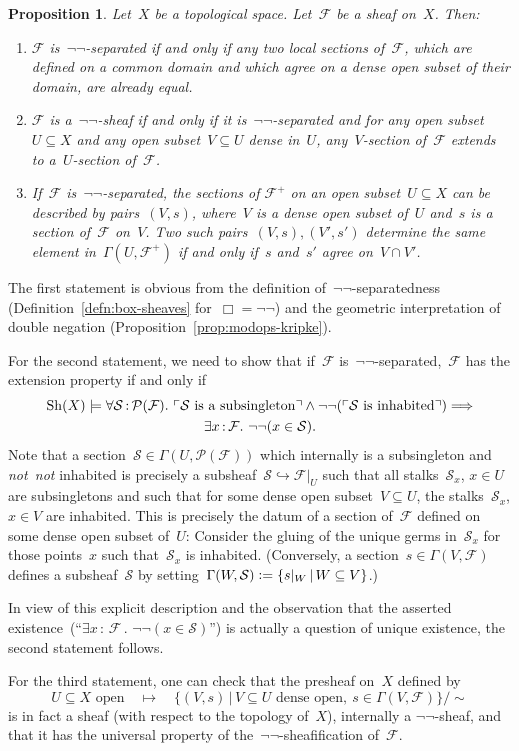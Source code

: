 \documentclass[10pt,reqno,a4paper]{amsbook}
\makeatletter
\theoremstyle{definition}
\theoremstyle{plain}
\newtheorem{prop}[defn]{Proposition}
\theoremstyle{remark}
\newcommand{\F}{\mathcal{F}}
\renewcommand{\P}{\mathcal{P}}
\renewcommand{\S}{\mathcal{S}}
\newcommand{\Sh}{\mathrm{Sh}}
\newcommand{\?}{\,{:}\,}
\renewcommand{\_}{\mathpunct{.}\,}
\newcommand{\speak}[1]{\ulcorner\text{\textnormal{#1}}\urcorner}
\newcommand{\notnot}{\emph{not~not}\xspace}
\newcommand{\defeq}{\vcentcolon=}
\renewenvironment{proof}[1][\proofname]{\par
  \pushQED{\qed}%
  \normalfont \topsep6\p@\@plus6\p@\relax
  \trivlist
  \item[\hskip\labelsep
        \itshape
    #1\@addpunct{.}]\ignorespaces
}{%
  \popQED\endtrivlist\@endpefalse
}
\makeatother
\begin{document}
\begin{prop}\label{prop:negneg-sheaves}
Let~$X$ be a topological space. Let~$\F$ be a sheaf on~$X$. Then:
\begin{enumerate}
\item $\F$ is~$\neg\neg$-separated if and only if any two local sections
of~$\F$, which are defined on a common domain and which agree on a dense open
subset of their domain, are already equal.
\item $\F$ is a~$\neg\neg$-sheaf if and only if it is~$\neg\neg$-separated and
for any open subset~$U \subseteq X$ and any open subset~$V \subseteq U$ dense
in~$U$, any~$V$-section of~$\F$ extends to a~$U$-section of~$\F$.
\item If~$\F$ is~$\neg\neg$-separated, the sections of $\F^+$ on an open
subset~$U \subseteq X$ can be described by pairs~$(V,s)$, where~$V$ is a dense
open subset of~$U$ and~$s$ is a section of~$\F$ on~$V$. Two such pairs~$(V,s),
(V',s')$ determine the same element in~$\Gamma(U,\F^+)$ if and only if~$s$ and~$s'$
agree on~$V \cap V'$.
\end{enumerate}
\end{prop}
\begin{proof}
The first statement is obvious from the definition of~$\neg\neg$-separatedness
(Definition~\ref{defn:box-sheaves} for~$\Box = \neg\neg$) and the geometric
interpretation of double negation (Proposition~\ref{prop:modops-kripke}).

For the second statement, we need to show that if~$\F$
is~$\neg\neg$-separated,~$\F$ has the extension property if and only if
\begin{multline*}
  \Sh(X) \models \forall \S \? \P(\F)\_
  \speak{$\S$ is a subsingleton} \wedge
  \neg\neg(\speak{$\S$ is inhabited}) \Longrightarrow \\
  \exists x\?\F\_ \neg\neg(x \in \S).
\end{multline*}
Note that a section~$\S \in \Gamma(U,\P(\F))$ which internally is a
subsingleton and \notnot inhabited is precisely a subsheaf~$\S \hookrightarrow
\F|_U$ such that all stalks~$\S_x$, $x \in U$ are subsingletons and such that for
some dense open subset~$V \subseteq U$, the stalks~$\S_x$, $x \in V$ are
inhabited. This is precisely the datum of a section of~$\F$ defined on some
dense open subset of~$U$: Consider the gluing of the unique germs in~$\S_x$ for
those points~$x$ such that~$\S_x$ is inhabited. (Conversely, a section~$s \in
\Gamma(V,\F)$ defines a subsheaf~$\S$ by setting~$\Gamma(W,\S) \defeq \{ s|_W \,|\,
W \subseteq V \}$.)

In view of this explicit description and the observation that the asserted
existence~(``$\exists x\?\F\_ \neg\neg(x \in \S)$'') is actually a question of
unique existence, the second statement follows.

For the third statement, one can check that the presheaf on~$X$ defined by
\[ \text{$U \subseteq X$ open} \quad\longmapsto\quad
  \{ (V,s) \,|\, \text{$V \subseteq U$ dense open},\ s \in \Gamma(V,\F)
  \}/{\sim} \]
is in fact a sheaf (with respect to the topology of~$X$), internally a $\neg\neg$-sheaf,
and that it has the universal property of the~$\neg\neg$-sheafification
of~$\F$.
\end{proof}
\end{document}
